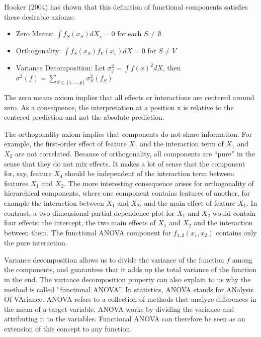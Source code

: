 \documentclass[12pt,]{krantz}
\providecommand{\tightlist}{%
  \setlength{\itemsep}{0pt}\setlength{\parskip}{0pt}}
\begin{document}
Hooker (2004) has shown that this definition of functional components
satisfies these desirable axioms:

\begin{itemize}
\tightlist
\item
  Zero Means: \(\int{}f_S(x_S)dX_s=0\) for each \(S\neq\emptyset\).
\item
  Orthogonality: \(\int{}f_S(x_S)f_V(x_v)dX=0\) for \(S\neq{}V\)
\item
  Variance Decomposition: Let \(\sigma^2_{f}=\int{}f(x)^2dX\), then
  \(\sigma^2(f) = \sum_{S \subseteq \{1,\ldots,p\}} \sigma^2_S(f_S)\)
\end{itemize}

The zero means axiom implies that all effects or interactions are
centered around zero. As a consequence, the interpretation at a position
x is relative to the centered prediction and not the absolute
prediction.

The orthogonality axiom implies that components do not share
information. For example, the first-order effect of feature \(X_1\) and
the interaction term of \(X_{1}\) and \(X_2\) are not correlated.
Because of orthogonality, all components are ``pure'' in the sense that
they do not mix effects. It makes a lot of sense that the component for,
say, feature \(X_4\) should be independent of the interaction term
between features \(X_1\) and \(X_2\). The more interesting consequence
arises for orthogonality of hierarchical components, where one component
contains features of another, for example the interaction between
\(X_1\) and \(X_2\), and the main effect of feature \(X_1\). In
contrast, a two-dimensional partial dependence plot for \(X_1\) and
\(X_2\) would contain four effects: the intercept, the two main effects
of \(X_1\) and \(X_2\) and the interaction between them. The functional
ANOVA component for \(f_{1,2}(x_1,x_2)\) contains only the pure
interaction.

Variance decomposition allows us to divide the variance of the function
\(f\) among the components, and guarantees that it adds up the total
variance of the function in the end. The variance decomposition property
can also explain to us why the method is called ``functional ANOVA''. In
statistics, ANOVA stands for ANalysis Of VAriance. ANOVA refers to a
collection of methods that analyze differences in the mean of a target
variable. ANOVA works by dividing the variance and attributing it to the
variables. Functional ANOVA can therefore be seen as an extension of
this concept to any function.
\end{document}
